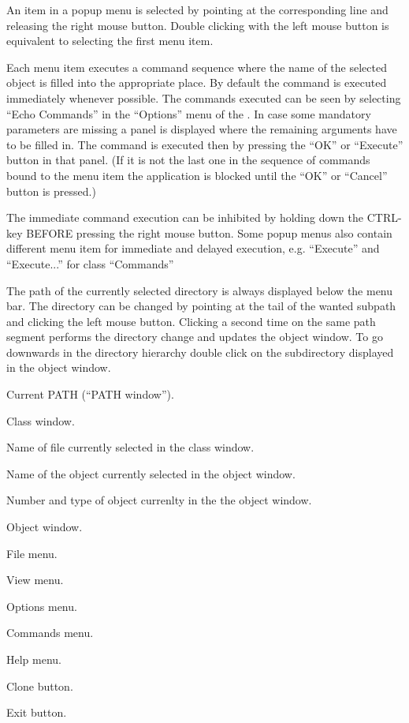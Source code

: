    An item in a popup menu is selected by pointing at the corresponding line
   and releasing the right mouse button.  Double clicking with the left mouse
   button is equivalent to selecting the first menu item.

   Each menu item executes a command sequence where the name of the selected
   object is filled into the appropriate place.  By default the command is
   executed immediately whenever possible. The commands executed can be seen
   by selecting ``Echo Commands'' in the ``Options'' menu of the \EW.
   In case some mandatory parameters are missing a panel is displayed
   where the remaining arguments have to be filled in.  The command is
   executed then by pressing the ``OK'' or ``Execute'' button in that panel.
   (If it is not the last one in the sequence of commands bound to the menu item
   the application is blocked until the ``OK'' or ``Cancel'' button is pressed.)

   The immediate command execution can be inhibited by holding down the
   CTRL-key BEFORE pressing the right mouse button.  Some popup menus also
   contain different menu item for immediate and delayed execution, e.g.
   ``Execute'' and ``Execute...'' for class ``Commands''

   The path of the currently selected directory is always displayed below the
   menu bar.  The directory can be changed by pointing at the tail of the
   wanted subpath and clicking the left mouse button.  Clicking a second time
   on the same path segment performs the directory change and updates the
   object window.  To go downwards in the directory hierarchy double click on
   the subdirectory displayed in the object window.


\begin{minipage}[t]{.65\linewidth}
\begin{EnumZB}
\item Current PATH (``PATH window'').
\item Class window.
\item Name of file currently selected in the class window.
\item Name of the object currently selected in the object window.
\item Number and type of object currenlty in the the object window.
\item Object window.
\end{EnumZB}
\end{minipage}\hfill
\begin{minipage}[t]{.31\linewidth}
\begin{EnumZW}
\item File menu.
\item View menu.
\item Options menu.
\item Commands menu.
\item Help menu.
\item Clone button.
\item Exit button.
\end{EnumZW}
\end{minipage}


